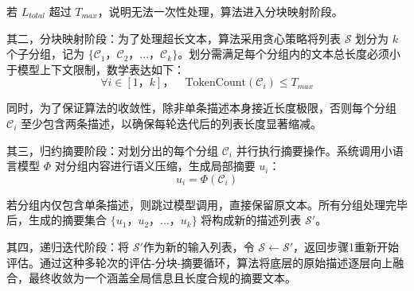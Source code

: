 \documentclass[promaster, vlined]{DissertUESTC}
\begin{document}
若 $L_{total}$ 超过 $T_{max}$，说明无法一次性处理，算法进入分块映射阶段。

其二，分块映射阶段：为了处理超长文本，算法采用贪心策略将列表 $\mathcal{S}$ 划分为 $k$ 个子分组，记为 $\{\mathcal{C}_1， \mathcal{C}_2， ...， \mathcal{C}_k\}$。划分需满足每个分组内的文本总长度必须小于模型上下文限制，数学表达如下：
\begin{equation}
\forall i \in [1， k]， \quad \text{TokenCount}(\mathcal{C}_i) \le T_{max}
\end{equation}

同时，为了保证算法的收敛性，除非单条描述本身接近长度极限，否则每个分组 $\mathcal{C}_i$ 至少包含两条描述，以确保每轮迭代后的列表长度显著缩减。

其三，归约摘要阶段：对划分出的每个分组 $\mathcal{C}_i$ 并行执行摘要操作。系统调用小语言模型 $\Phi$ 对分组内容进行语义压缩，生成局部摘要 $u_i$：
\begin{equation}
u_i = \Phi(\mathcal{C}_i)
\end{equation}

若分组内仅包含单条描述，则跳过模型调用，直接保留原文本。所有分组处理完毕后，生成的摘要集合 $\{u_1， u_2， ...， u_k\}$ 将构成新的描述列表 $\mathcal{S'}$。

其四，递归迭代阶段：将 $\mathcal{S'}$作为新的输入列表，令 $\mathcal{S} \leftarrow \mathcal{S'}$，返回步骤1重新开始评估。通过这种多轮次的评估-分块-摘要循环，算法将底层的原始描述逐层向上融合，最终收敛为一个涵盖全局信息且长度合规的摘要文本。
\end{document}
